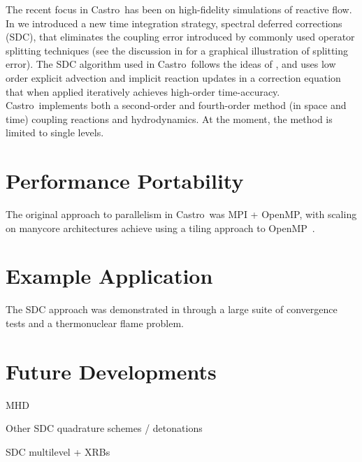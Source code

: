 \documentclass[a4paper]{jpconf}
\newcommand{\castro}{{\sffamily Castro}}
\begin{document}
The recent focus in \castro\ has been on high-fidelity simulations of
reactive flow.  In \cite{castro:sdc} we introduced a new time
integration strategy, spectral deferred corrections (SDC), that
eliminates the coupling error introduced by commonly used operator
splitting techniques (see the discussion in \cite{astronum:2018} for a
graphical illustration of splitting error).  The SDC algorithm used in
\castro\ follows the ideas of \cite{dutt:2000,minion:2003}, and uses
low order explicit advection and implicit reaction updates in a
correction equation that when applied iteratively achieves high-order
time-accuracy.  \castro\ implements both a second-order and
fourth-order method (in space and time) coupling reactions and
hydrodynamics.  At the moment, the method is limited to single levels.


\section{Performance Portability}

The original approach to parallelism in \castro\ was MPI + OpenMP,
with scaling on manycore architectures achieve using a tiling approach
to OpenMP~\cite{tiling}.  

\section{Example Application}

The SDC approach was demonstrated in \cite{castro:sdc} through a large
suite of convergence tests and a thermonuclear flame problem.  

\section{Future Developments}

MHD

Other SDC quadrature schemes / detonations

SDC multilevel + XRBs






\end{document}
